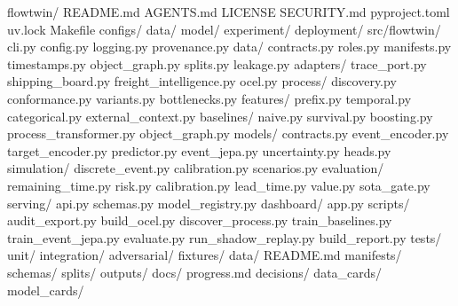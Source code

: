 \documentclass[
  spanish,
  10pt,
  a4paper,
]{article}
\newenvironment{Shaded}{}{}
\newcommand{\NormalTok}[1]{#1}
\begin{document}
\begin{Shaded}
\begin{Highlighting}[]
\NormalTok{flowtwin/}
\NormalTok{  README.md}
\NormalTok{  AGENTS.md}
\NormalTok{  LICENSE}
\NormalTok{  SECURITY.md}
\NormalTok{  pyproject.toml}
\NormalTok{  uv.lock}
\NormalTok{  Makefile}
\NormalTok{  configs/}
\NormalTok{    data/}
\NormalTok{    model/}
\NormalTok{    experiment/}
\NormalTok{    deployment/}
\NormalTok{  src/flowtwin/}
\NormalTok{    cli.py}
\NormalTok{    config.py}
\NormalTok{    logging.py}
\NormalTok{    provenance.py}
\NormalTok{    data/}
\NormalTok{      contracts.py}
\NormalTok{      roles.py}
\NormalTok{      manifests.py}
\NormalTok{      timestamps.py}
\NormalTok{      object\_graph.py}
\NormalTok{      splits.py}
\NormalTok{      leakage.py}
\NormalTok{      adapters/}
\NormalTok{        trace\_port.py}
\NormalTok{        shipping\_board.py}
\NormalTok{        freight\_intelligence.py}
\NormalTok{        ocel.py}
\NormalTok{    process/}
\NormalTok{      discovery.py}
\NormalTok{      conformance.py}
\NormalTok{      variants.py}
\NormalTok{      bottlenecks.py}
\NormalTok{    features/}
\NormalTok{      prefix.py}
\NormalTok{      temporal.py}
\NormalTok{      categorical.py}
\NormalTok{      external\_context.py}
\NormalTok{    baselines/}
\NormalTok{      naive.py}
\NormalTok{      survival.py}
\NormalTok{      boosting.py}
\NormalTok{      process\_transformer.py}
\NormalTok{      object\_graph.py}
\NormalTok{    models/}
\NormalTok{      contracts.py}
\NormalTok{      event\_encoder.py}
\NormalTok{      target\_encoder.py}
\NormalTok{      predictor.py}
\NormalTok{      event\_jepa.py}
\NormalTok{      uncertainty.py}
\NormalTok{      heads.py}
\NormalTok{    simulation/}
\NormalTok{      discrete\_event.py}
\NormalTok{      calibration.py}
\NormalTok{      scenarios.py}
\NormalTok{    evaluation/}
\NormalTok{      remaining\_time.py}
\NormalTok{      risk.py}
\NormalTok{      calibration.py}
\NormalTok{      lead\_time.py}
\NormalTok{      value.py}
\NormalTok{      sota\_gate.py}
\NormalTok{    serving/}
\NormalTok{      api.py}
\NormalTok{      schemas.py}
\NormalTok{      model\_registry.py}
\NormalTok{    dashboard/}
\NormalTok{      app.py}
\NormalTok{  scripts/}
\NormalTok{    audit\_export.py}
\NormalTok{    build\_ocel.py}
\NormalTok{    discover\_process.py}
\NormalTok{    train\_baselines.py}
\NormalTok{    train\_event\_jepa.py}
\NormalTok{    evaluate.py}
\NormalTok{    run\_shadow\_replay.py}
\NormalTok{    build\_report.py}
\NormalTok{  tests/}
\NormalTok{    unit/}
\NormalTok{    integration/}
\NormalTok{    adversarial/}
\NormalTok{    fixtures/}
\NormalTok{  data/}
\NormalTok{    README.md}
\NormalTok{    manifests/}
\NormalTok{    schemas/}
\NormalTok{    splits/}
\NormalTok{  outputs/}
\NormalTok{  docs/}
\NormalTok{    progress.md}
\NormalTok{    decisions/}
\NormalTok{    data\_cards/}
\NormalTok{    model\_cards/}
\end{Highlighting}
\end{Shaded}
\end{document}
